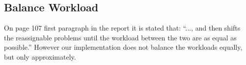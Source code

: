 \subsection*{Balance Workload}
On page 107 first paragraph in the report it is stated that: ``..., and then shifts the reassignable problems until the workload between the two are as equal as possible.''
However our implementation does not balance the workloads equally, but only approximately.